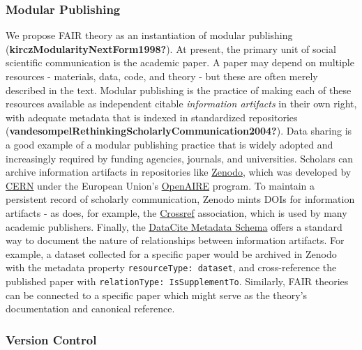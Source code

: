 \documentclass[
  man,floatsintext]{apa6}
\begin{document}
\subsubsection{Modular Publishing}\label{modular-publishing}

We propose FAIR theory as an instantiation of modular publishing (\textbf{kirczModularityNextForm1998?}).
At present, the primary unit of social scientific communication is the academic paper.
A paper may depend on multiple resources - materials, data, code, and theory - but these are often merely described in the text.
Modular publishing is the practice of making each of these resources available as independent citable \emph{information artifacts} in their own right,
with adequate metadata that is indexed in standardized repositories (\textbf{vandesompelRethinkingScholarlyCommunication2004?}).
Data sharing is a good example of a modular publishing practice that is widely adopted and increasingly required by funding agencies, journals, and universities.
Scholars can archive information artifacts in repositories like \href{https://zenodo.org/}{Zenodo},
which was developed by \href{https://home.cern/}{CERN} under the European Union's \href{https://www.openaire.eu/}{OpenAIRE} program.
To maintain a persistent record of scholarly communication,
Zenodo mints DOIs for information artifacts - as does, for example, the \href{https://www.crossref.org/}{Crossref} association,
which is used by many academic publishers.
Finally, the \href{}{DataCite Metadata Schema} offers a standard way to document the nature of relationships between information artifacts.
For example, a dataset collected for a specific paper would be archived in Zenodo with the metadata property \texttt{resourceType:\ dataset},
and cross-reference the published paper with \texttt{relationType:\ IsSupplementTo}.
Similarly, FAIR theories can be connected to a specific paper which might serve as the theory's documentation and canonical reference.

\subsubsection{Version Control}\label{version-control}
\end{document}
